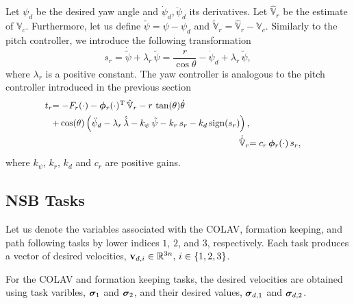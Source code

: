 Let $\psi_d$ be the desired yaw angle and $\dot{\psi}_d, \ddot{\psi}_d$ its derivatives.
Let $\hat{\mathbb{V}}_r$ be the estimate of $\mathbb{V}_c$.
Furthermore, let us define $\tilde{\psi} = \psi - \psi_d$ and $\tilde{\mathbb{V}}_r = \hat{\mathbb{V}}_r - \mathbb{V}_c$.
Similarly to the pitch controller, we introduce the following transformation
\begin{equation}
    s_r = \dot{\tilde{\psi}} + \lambda_r\,\tilde{\psi} = \frac{r}{\cos\theta} - \dot{\psi}_d + \lambda_r\,\tilde{\psi},
\end{equation}
where $\lambda_r$ is a positive constant.
The yaw controller is analogous to the pitch controller introduced in the previous section
\begin{align}        
    \begin{split}
        \scale[0.95]{t_r} &\scale[0.95]{= - F_r(\cdot) - \bs{\phi}_r(\cdot)\T\,\hat{\mathbb{V}}_r - r\,\tan(\theta)\dot{\theta}} \\
        & \scale[0.95]{ + \cos(\theta)\left(\ddot{\psi}_d - \lambda_r\,\dot{\tilde{\lambda}} - k_{\psi}\,\tilde{\psi} - k_r\,s_r - k_d\,{\rm sign}(s_r)\right), }
    \end{split} \label{eq:nsb_5dof_t_r} \\
    \scale[0.95]{\dot{\hat{\mathbb{V}}}_r} & \scale[0.95]{= c_r\,\bs{\phi}_r(\cdot)\,s_r,} \label{eq:nsb_5dof_V_hat_r}
\end{align}
where $k_{\psi}$, $k_r$, $k_d$ and $c_r$ are positive gains.

\subsection{NSB Tasks}
\label{sec:nsb_5dof_NSB}
Let us denote the variables associated with the COLAV, formation keeping, and path following tasks by lower indices $1$, $2$, and $3$, respectively.
Each task produces a vector of desired velocities, $\mathbf{v}_{d,i} \in \mathbb{R}^{3n},\, i\in\{1,2,3\}$.

For the COLAV and formation keeping tasks, the desired velocities are obtained using task varibles, $\bm{\sigma}_1$ and $\bm{\sigma}_2$, and their desired values, $\bm{\sigma}_{d,1}$ and $\bm{\sigma}_{d,2}$.

